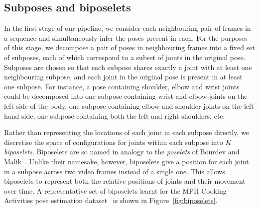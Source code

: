 \documentclass[runningheads]{llncs}
\begin{document}
\subsection{Subposes and biposelets}\label{sec:decomp}

In the first stage of our pipeline, we consider each neighbouring pair of frames
in a sequence and simultaneously infer the poses present in each. For the
purposes of this stage, we decompose a pair of poses in neighbouring frames into
a fixed set of subposes, each of which correspond to a subset of joints in the
original pose. Subposes are chosen so that each subpose shares exactly a joint
with at least one neighbouring subpose, and each joint in the original pose is
present in at least one subpose. For instance, a pose containing shoulder, elbow
and wrist joints could be decomposed into one subpose containing wrist and elbow
joints on the left side of the body, one subpose containing elbow and shoulder
joints on the left hand side, one subpose containing both the left and right
shoulders, etc.

Rather than representing the locations of each joint in each subpose directly,
we discretise the space of configurations for joints within each subpose into
$K$ \textit{biposelets}. Biposelets are so named in analogy to the
\textit{poselets} of Bourdev and Malik~\cite{bourdev2009poselets}. Unlike their
namesake, however, biposelets give a position for each joint in a subpose across
two video frames instead of a single one. This allows biposelets to represent
both the relative positions of joints and their movement over time. A
representative set of biposelets learnt for the MPII Cooking Activities pose
estimation dataset~\cite{rohrbach2012database} is shown in
Figure~\ref{fig:biposelets}.
\end{document}

